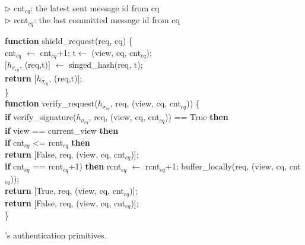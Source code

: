 \begin{algorithm}
\SetAlgoLined
\small


$\triangleright$ cnt$_{cq}$: the latest sent message id from  cq\\$\triangleright$ rcnt$_{cq}$: the last committed message id from cq



\textbf{function} shield\_request(req, cq) \{ \\
\Indp
cnt$_{cq}$ $\leftarrow$ cnt$_{cq}$+1; t$\leftarrow$ (view, cq, cnt$_{cq}$);\\
$[$$h_{\sigma_{cq}}$, (req,t)$]$  $\leftarrow$ singed\_hash(req, t);\\
\textbf{return} $[$$h_{\sigma_{cq}}$, (req,t)$]$;\\
\Indm
\} \\



\textbf{function} verify\_request($h_{\sigma_{cq}}$, req, (view, cq, cnt$_{cq}$)) \{ \\
\Indp
    \textbf{if} verify\_signature($h_{\sigma_{cq}}$, req, (view, cq, cnt$_{cq}$)) == True \textbf{then}\\
    \Indp
        \textbf{if} view == current\_view \textbf{then}\\
        \Indp
            \textbf{if} cnt$_{cq}$ <= rcnt$_{cq}$ \textbf{then}\\
            \Indp
                \textbf{return} [False, req, (view, cq, cnt$_{cq}$)]; \\
            \Indm
            \textbf{if} cnt$_{cq}$ == rcnt$_{cq}$+1) \textbf{then} rcnt$_{cq}$ $\leftarrow$ rcnt$_{cq}$+1;
            buffer\_locally(req, (view, cq, cnt$_{cq}$));\\
                \textbf{return} [True, req, (view, cq, cnt$_{cq}$)]; \\
            
        \Indm
    \Indm
    \textbf{return} [False, req, (view, cq, cnt$_{cq}$)]; \\

\Indm
\} \\
\vspace{-1pt}
\caption{\projecttitle{}'s authentication primitives.}
\vspace{-3pt}
\label{algo:primitives}
\end{algorithm}

